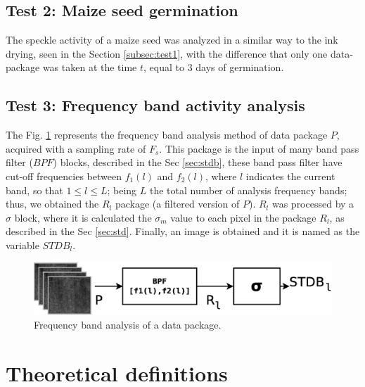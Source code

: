 \documentclass[review]{elsarticle}
\begin{document}
\subsection{Test 2: Maize seed germination}
\label{subsec:test2}
The speckle activity of a maize seed
was analyzed in a similar way to the ink drying, seen in the Section \ref{subsec:test1}, 
with the difference that only one data-package was taken at the time $t$, equal to 3 days of germination.

\subsection{Test 3: Frequency band activity analysis}
\label{subsec:test3}

The Fig. \ref{fig:test3} represents the frequency band analysis method of data package $P$, 
acquired  with a sampling rate of $F_s$. This package is the input of many band pass filter (\hyperref[sec:stdb]{$BPF$}) blocks,
described in the Sec \ref{sec:stdb}, these band pass filter have cut-off frequencies between $f_1(l)$ and $f_2(l)$,
where $l$ indicates the current band, so that $1\leq l\leq L$;
being $L$ the total number of analysis frequency bands; 
thus, we obtained the  $R_l$ package (a filtered version of $P$). $R_l$ was processed 
by a $\sigma$ block, where it is calculated the $\sigma_{m}$ value to each pixel in the package $R_l$,
as described in the Sec \ref{sec:std}. Finally, 
an image is obtained and it is named as the variable $STDB_l$.
\begin{figure}[ht!]
\centering
\includegraphics[width=0.55\columnwidth]{test3.eps}
\caption{Frequency band analysis of a data package.}
\label{fig:test3}
\end{figure}

 

\section{Theoretical definitions}
\label{sec:theoretical}
\end{document}
